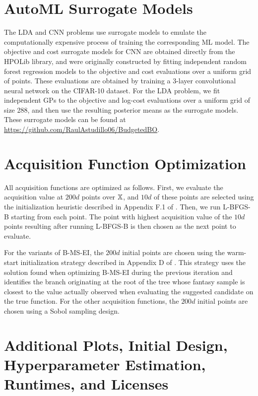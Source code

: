 \section{AutoML Surrogate Models}
\label{supp:automl}
The LDA and CNN problems use surrogate models to emulate the computationally expensive process of training the corresponding ML model. The objective and cost surrogate models for CNN are obtained directly from the HPOLib library, and were originally constructed by fitting independent random forest regression models to the objective and cost evaluations over a uniform grid of points. These evaluations are obtained by training a 3-layer convolutional neural network on the CIFAR-10 dataset. For the LDA problem, we fit independent GPs to the objective and log-cost evaluations over a uniform grid of size 288, and then use the resulting posterior means as the surrogate models. These surrogate models can be found at \url{https://github.com/RaulAstudillo06/BudgetedBO}. 




\section{Acquisition Function Optimization}
\label{supp:acqfopt}
All acquisition functions are optimized as follows. First, we evaluate the acquisition value at $200d$ points over $\mathbb{X}$, and $10d$ of these points are selected using the initialization heuristic described in Appendix F.1 of \cite{balandat2020botorch}. Then, we run L-BFGS-B \citep{byrd1995limited} starting from each point. The point with highest acquisition value of the $10d$ points resulting after running L-BFGS-B is then chosen as the next point to evaluate. 

For the variants of B-MS-EI, the $200d$ initial points are chosen using the warm-start initialization strategy described in Appendix D of \cite{jiang2020efficient}. This strategy uses the solution found when optimizing B-MS-EI during the previous iteration and identifies the branch originating at the root of the tree whose fantasy sample is closest to the value actually observed when evaluating the suggested candidate on the true function. For the other acquisition functions, the $200d$ initial points are chosen using a Sobol sampling design.


\section{Additional Plots, Initial Design, Hyperparameter Estimation, Runtimes, and Licenses}
\label{supp:additional}

